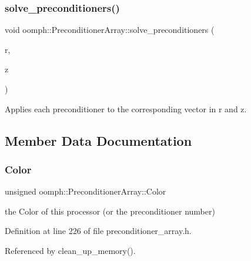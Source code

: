 \subsubsection{\texorpdfstring{solve\+\_\+preconditioners()}{solve\_preconditioners()}\hspace{0.1cm}{\footnotesize\ttfamily [2/2]}}
{\footnotesize\ttfamily void oomph\+::\+Preconditioner\+Array\+::solve\+\_\+preconditioners (\begin{DoxyParamCaption}\item[{const \hyperlink{classoomph_1_1Vector}{Vector}$<$ \hyperlink{classoomph_1_1DoubleVector}{Double\+Vector} $>$ \&}]{r,  }\item[{\hyperlink{classoomph_1_1Vector}{Vector}$<$ \hyperlink{classoomph_1_1DoubleVector}{Double\+Vector} $>$ \&}]{z }\end{DoxyParamCaption})}



Applies each preconditioner to the corresponding vector in r and z. 



\subsection{Member Data Documentation}
\mbox{\label{classoomph_1_1PreconditionerArray_a5012c60980bdbffb480209a111e771a7}} 
\subsubsection{\texorpdfstring{Color}{Color}}
{\footnotesize\ttfamily unsigned oomph\+::\+Preconditioner\+Array\+::\+Color\hspace{0.3cm}{\ttfamily [private]}}



the Color of this processor (or the preconditioner number) 



Definition at line 226 of file preconditioner\+\_\+array.\+h.



Referenced by clean\+\_\+up\+\_\+memory().

\mbox{\label{classoomph_1_1PreconditionerArray_ac233896152000f13b3527d9ff087c113}} 
